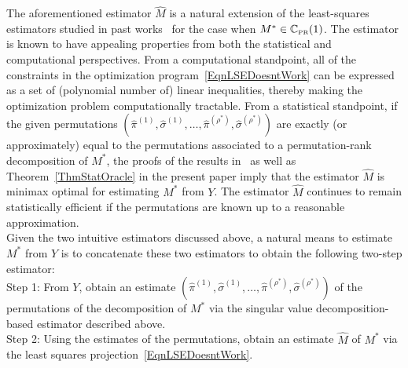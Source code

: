 \documentclass[11pt, hidelinks]{article} %
\newcommand{\wtmatrix}{M}
\newcommand{\wtstar}{\wtmatrix^*}
\newcommand{\matrixset}{\mathbb{C}}
\newcommand{\wthat}{\widehat{\wtmatrix}}
\newcommand{\permset}{\matrixset_{\mbox{\tiny PR}}}
\newcommand{\permone}{\permset(1)}
\newcommand{\obs}{\ensuremath{Y}}
\newcommand{\permrank}{\rho}
\newcommand{\permstar}{\permrank^*}
\newcommand{\sig}{\sigma}
\begin{document}
The aforementioned estimator $\wthat$ is a natural extension of the least-squares estimators studied in past works~\cite{shah2015stochastically, shah2016feeling} for the case when $\wtstar \in \permone$. The estimator is known to have appealing properties from both the statistical and computational perspectives. From a computational standpoint, all of the constraints in the optimization
program~\eqref{EqnLSEDoesntWork} can be expressed as a set of
(polynomial number of) linear inequalities, thereby making the
optimization problem computationally tractable. From a statistical standpoint, if the given permutations $(\widehat{\pi}^{(1)},\widehat{\sig}^{(1)},\ldots,\widehat{\pi}^{(\permstar)},\widehat{\sig}^{(\permstar)})$ are exactly (or approximately) equal to the permutations associated to a permutation-rank decomposition of $\wtstar$, the proofs of the results in~\cite{shah2015stochastically,shah2016feeling} as well as Theorem~\ref{ThmStatOracle} in the present paper imply that the estimator $\wthat$ is minimax optimal for estimating $\wtstar$ from $\obs$. The estimator $\wthat$ continues  to remain statistically efficient if the permutations are known up to a reasonable approximation.\\

Given the two intuitive estimators discussed above, a natural means to estimate $\wtstar$ from $\obs$ is to concatenate these two estimators to obtain the following two-step estimator:\\
Step 1: From $\obs$, obtain an estimate $(\widehat{\pi}^{(1)},\widehat{\sig}^{(1)},\ldots,\widehat{\pi}^{(\permstar)},\widehat{\sig}^{(\permstar)})$ of the permutations of the decomposition of $\wtstar$ via the singular value decomposition-based estimator described above.\\
%
Step 2: Using the estimates of the permutations, obtain an estimate $\wthat$ of $\wtstar$ via the least squares projection~\eqref{EqnLSEDoesntWork}.\\
\end{document}
